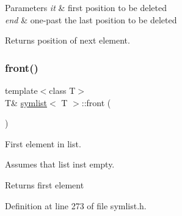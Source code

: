 \begin{DoxyParams}{Parameters}
{\em it} & first position to be deleted \\
\hline
{\em end} & one-\/past the last position to be deleted\\
\hline
\end{DoxyParams}
\begin{DoxyReturn}{Returns}
position of next element. 
\end{DoxyReturn}
\mbox{\label{classsymlist_afd4b55616fc20033d4a47684551866e8}} 
\subsubsection{\texorpdfstring{front()}{front()}}
{\footnotesize\ttfamily template$<$class T$>$ \\
T\& \mbox{\hyperlink{classsymlist}{symlist}}$<$ T $>$\+::front (\begin{DoxyParamCaption}{ }\end{DoxyParamCaption})\hspace{0.3cm}{\ttfamily [inline]}}



First element in list. 

Assumes that list ins\textquotesingle{}t empty.

\begin{DoxyReturn}{Returns}
first element 
\end{DoxyReturn}


Definition at line 273 of file symlist.\+h.


